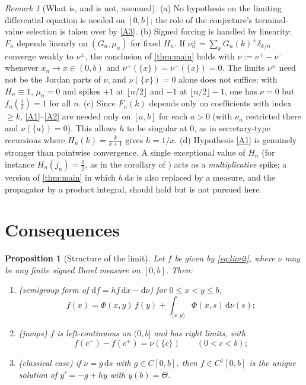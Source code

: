 \documentclass[11pt]{article}
\newtheorem{proposition}[theorem]{Proposition}
\theoremstyle{definition}
\theoremstyle{remark}
\newtheorem{remark}[theorem]{Remark}
\newcommand{\dd}{\,\mathrm{d}}
\newcommand{\1}{\mathbf{1}}
\newcommand{\fl}[1]{\lfloor #1\rfloor}
\begin{document}
\begin{remark}[What is, and is not, assumed]\label{rem:assumptions}
(a) No hypothesis on the limiting differential equation is needed on $[0,b]$; the role of the
conjecture's terminal-value selection is taken over by \ref{A3}.
(b) Signed forcing is handled by linearity: $F_n$ depends linearly on $(G_n,\mu_n)$ for fixed $H_n$.
If $\nu_n^\pm=\sum_kG_n(k)^\pm\delta_{k/n}$ converge weakly to $\nu^\pm$, the conclusion of
\cref{thm:main} holds with $\nu:=\nu^+-\nu^-$ whenever $x_n\to x\in(0,b)$ and
$\nu^+(\{x\})=\nu^-(\{x\})=0$. The limits $\nu^\pm$ need not be the Jordan parts of $\nu$, and
$\nu(\{x\})=0$ alone does not suffice: with $H_n\equiv1$, $\mu_n=0$ and spikes $+1$ at
$\fl{n/2}$ and $-1$ at $\fl{n/2}-1$, one has $\nu=0$ but $f_n(\frac12)=1$ for all $n$.
(c) Since $F_n(k)$ depends only on coefficients with index $\ge k$, \ref{A1}--\ref{A2} are needed
only on $[a,b]$ for each $a>0$ (with $\nu_n$ restricted there and $\nu(\{a\})=0$). This allows $h$ to
be singular at $0$, as in secretary-type recursions where $H_n(k)=\frac{k}{k+1}$ gives $h=1/x$.
(d) Hypothesis \ref{A1} is genuinely stronger than pointwise convergence. A single exceptional
value of $H_n$ (for instance $H_n(j_n)=\frac12$, as in the corollary of \cite{Pri26}) acts as a
\emph{multiplicative} spike; a version of \cref{thm:main} in which $h\dd x$ is also replaced by a
measure, and the propagator by a product integral, should hold but is not pursued here.
\end{remark}

\section{Consequences}\label{sec:consequences}

\begin{proposition}[Structure of the limit]\label{prop:structure}
Let $f$ be given by \eqref{eq:limit}, where $\nu$ may be any finite signed Borel measure on $[0,b]$.
Then:
\begin{enumerate}[label=\textup{(\roman*)},itemsep=1pt]
\item \emph{(semigroup form of $\mathrm{d}f=hf\dd x-\mathrm{d}\nu$)} for $0\le x<y\le b$,
\[f(x)=\Phi(x,y)\,f(y)+\int_{[x,y)}\Phi(x,s)\dd\nu(s);\]
\item \emph{(jumps)} $f$ is left-continuous on $(0,b]$ and has right limits, with
\[f(c^-)-f(c^+)=\nu(\{c\})\qquad(0<c<b);\]
\item \emph{(classical case)} if $\nu=g\dd s$ with $g\in C[0,b]$, then $f\in C^1[0,b]$ is the
unique solution of $y'=-g+hy$ with $y(b)=\Theta$.
\end{enumerate}
\end{proposition}
\end{document}
